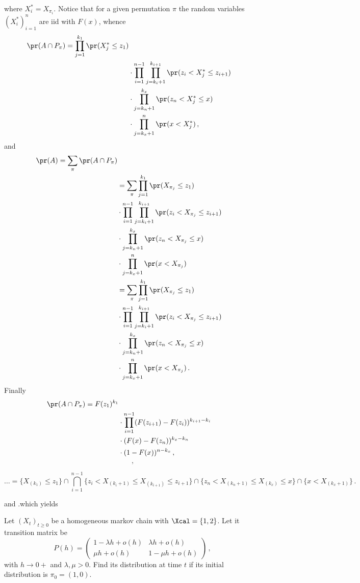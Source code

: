 where $X^*_i = X_{\pi_i}$. Notice that for a given permutation $\pi$ the random
variables $(X^*_i)_{i=1}^n$ are iid with $F(x)$, whence
\begin{align*}
	\pr( A\cap P_\pi ) = \prod_{j=1}^{k_1} \pr(X^*_j \leq z_1) \\
		&\cdot \prod_{i=1}^{n-1} \prod_{j=k_i+1}^{k_{i+1}} \pr(z_i < X^*_j \leq z_{i+1}) \\
		&\cdot \prod_{j=k_n+1}^{k_x} \pr( z_n < X^*_j \leq x ) \\
		&\cdot \prod_{j=k_x+1}^n \pr(x < X^*_j)
	\,,
\end{align*}
and
\begin{align*}
	\pr( A ) = \sum_\pi \pr( A\cap P_\pi ) \\
		&= \sum_\pi \prod_{j=1}^{k_1} \pr(X_{\pi_j} \leq z_1) \\
			&\cdot \prod_{i=1}^{n-1} \prod_{j=k_i+1}^{k_{i+1}} \pr(z_i < X_{\pi_j} \leq z_{i+1}) \\
			&\cdot \prod_{j=k_n+1}^{k_x} \pr( z_n < X_{\pi_j} \leq x ) \\
			&\cdot \prod_{j=k_x+1}^n \pr(x < X_{\pi_j}) \\

		&= \sum_\pi \prod_{j=1}^{k_1} \pr(X_{\pi_j} \leq z_1) \\
			&\cdot \prod_{i=1}^{n-1} \prod_{j=k_i+1}^{k_{i+1}} \pr(z_i < X_{\pi_j} \leq z_{i+1}) \\
			&\cdot \prod_{j=k_n+1}^{k_x} \pr( z_n < X_{\pi_j} \leq x ) \\
			&\cdot \prod_{j=k_x+1}^n \pr(x < X_{\pi_j}) \,.
\end{align*}
Finally
\begin{align*}
	\pr( A\cap P_\pi ) = F(z_1)^{k_1} \\
		&\cdot \prod_{i=1}^{n-1} ( F(z_{i+1}) - F(z_i) )^{ k_{i+1} - k_i } \\
		&\cdot ( F(x) - F(z_n) )^{k_x-k_n} \\
		&\cdot ( 1 - F(x) )^{n-k_x} \,,
\end{align*}
\[ 

\,,\]



\[ \ldots = \{ X_{(k_1)} \leq z_1\}
	\cap \bigcap_{i=1}^{n-1} \{ z_i < X_{(k_i+1)} \leq X_{(k_{i+1})} \leq z_{i+1}\}
	\cap \{ z_n < X_{(k_n+1)} \leq X_{(k_x)} \leq x \} \cap \{ x < X_{(k_x+1)} \} \,.\]

 and .which yields


Let $(X_t)_{t\geq 0}$ be a homogeneous markov chain with $\Xcal = \{1,2\}$. Let
it transition matrix be
\[ P(h) = \begin{pmatrix}
	1-\lambda h+o(h) & \lambda h+o(h)\\
	\mu h + o(h) & 1-\mu h+o(h)
\end{pmatrix} \,,\]
with $h\to0+$ and $\lambda,\mu > 0$. Find its distribution at time $t$ if its
initial distribution is $\pi_0 = (1,0)$.







